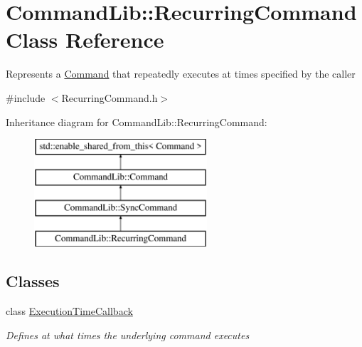 \hypertarget{class_command_lib_1_1_recurring_command}{}\section{Command\+Lib\+:\+:Recurring\+Command Class Reference}
\label{class_command_lib_1_1_recurring_command}


Represents a \mbox{\hyperlink{class_command_lib_1_1_command}{Command}} that repeatedly executes at times specified by the caller 




{\ttfamily \#include $<$Recurring\+Command.\+h$>$}

Inheritance diagram for Command\+Lib\+:\+:Recurring\+Command\+:\begin{figure}[H]
\begin{center}
\leavevmode
\includegraphics[height=4.000000cm]{class_command_lib_1_1_recurring_command}
\end{center}
\end{figure}
\subsection*{Classes}
\begin{DoxyCompactItemize}
\item 
class \mbox{\hyperlink{class_command_lib_1_1_recurring_command_1_1_execution_time_callback}{Execution\+Time\+Callback}}
\begin{DoxyCompactList}\small\item\em Defines at what times the underlying command executes \end{DoxyCompactList}\end{DoxyCompactItemize}
